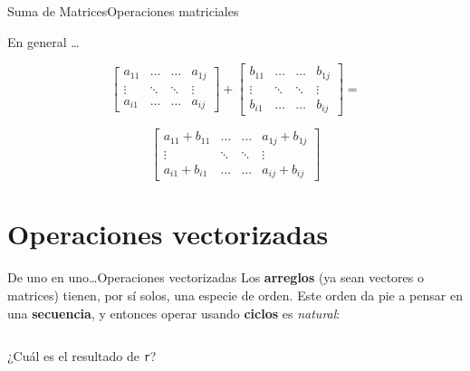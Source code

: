\documentclass[spanish, c]{beamer}
\begin{document}
\begin{frame}{Suma de Matrices}{Operaciones matriciales}

    En general \dots

    \bigskip

    \[%
        \begin{bmatrix}
            a_{11} & \dots & \dots & a_{1j} \\
            \vdots & \ddots & \ddots & \vdots \\
            a_{i1} & \dots & \dots & a_{ij}
        \end{bmatrix} +
        \begin{bmatrix}
            b_{11} & \dots & \dots & b_{1j} \\
            \vdots & \ddots & \ddots & \vdots \\
            b_{i1} & \dots & \dots & b_{ij}
        \end{bmatrix} =  \]
        
        \bigskip

        \[
        \begin{bmatrix}
            a_{11}  + b_{11} & \dots & \dots & a_{1j}  + b_{1j} \\
            \vdots & \ddots & \ddots & \vdots \\
            a_{i1}  + b_{i1} & \dots & \dots & a_{ij}  + b_{ij}
        \end{bmatrix} \]

\end{frame}

\section{Operaciones vectorizadas}

\begin{frame}[fragile]{De uno en uno\dots}{Operaciones vectorizadas}
    Los \textbf{arreglos} (ya sean vectores o matrices) tienen, por sí solos, una especie de orden.
    Este orden da pie a pensar en una \textbf{secuencia}, y entonces operar usando \textbf{ciclos} es \textit{natural}:

    \bigskip

    \begin{columns}
        \begin{column}{0.95\linewidth}
            
        \end{column}
    \end{columns}

    \bigskip

    ¿Cuál es el resultado de \texttt{r}?
\end{frame}
\end{document}
